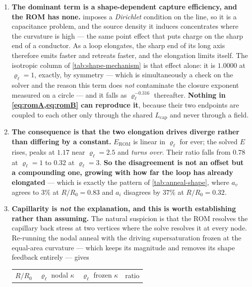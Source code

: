 \documentclass{article}
\begin{document}
\begin{enumerate}
\item \textbf{The dominant term is a shape-dependent capture efficiency, and the
      ROM has none.}  imposes a \emph{Dirichlet} condition on the
      line, so it is a capacitance problem, and the source density it induces
      concentrates where the curvature is high --- the same point effect that
      puts charge on the sharp end of a conductor. As a loop elongates, the sharp
      end of its long axis therefore emits faster and retreats faster, and the
      elongation limits itself. The isotropic column of
      \cref{tab:shape-mechanism} is that effect alone: it is
      $\mathbf{1.0000}$ at $\varrho_\ell=1$, exactly, by symmetry --- which is
      simultaneously a check on the solver and the reason this term does
      \emph{not} contaminate the closure exponent measured on a circle --- and it
      falls as $\varrho_\ell^{-0.316}$ thereafter. \textbf{Nothing in
      \cref{eq:romA,eq:romB} can reproduce it}, because their two endpoints are
      coupled to each other only through the shared $L_{\mathrm{cap}}$ and never
      through a field.
\item \textbf{The consequence is that the two elongation drives diverge rather
      than differing by a constant.} $E_{\mathrm{ROM}}$ is linear in
      $\varrho_\ell$ for ever; the solved $E$ rises, peaks at $1.17$ near
      $\varrho_\ell=2.5$ and \emph{turns over}. Their ratio falls from $0.78$ at
      $\varrho_\ell=1$ to $0.32$ at $\varrho_\ell=3$. \textbf{So the disagreement
      is not an offset but a compounding one, growing with how far the loop has
      already elongated} --- which is exactly the pattern of
      \cref{tab:anneal-shape}, where $a_v$ agrees to $3\%$ at $R/R_0=0.83$ and
      $a_i$ disagrees by $37\%$ at $R/R_0=0.32$.
\item \textbf{Capillarity is \emph{not} the explanation, and this is worth
      establishing rather than assuming.} The natural suspicion is that the ROM
      resolves the capillary back stress at two vertices where the solve resolves
      it at every node. Re-running the nodal anneal with the driving
      supersaturation frozen at the equal-area curvature --- which keeps its
      magnitude and removes its shape feedback entirely --- gives
      \begin{center}\small
      \begin{tabular}{@{}r rrr@{}}
      \toprule
      $R/R_0$ & $\varrho_\ell$ nodal $\kappa$ & $\varrho_\ell$ frozen $\kappa$ & ratio\\

\end{tabular}
\end{center}
\end{enumerate}
\end{document}
